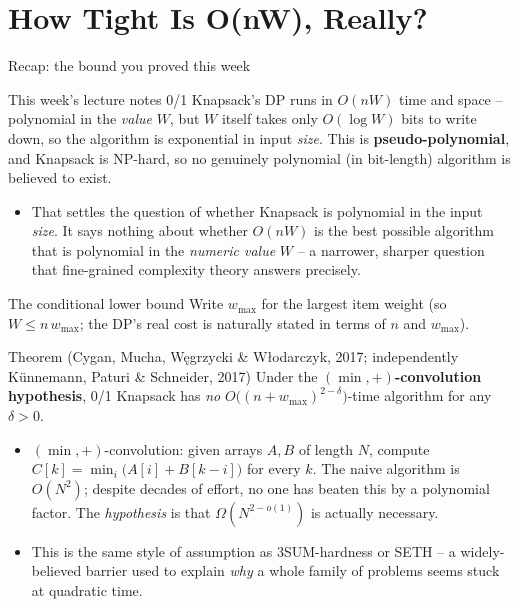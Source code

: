 \documentclass[11pt,aspectratio=169]{beamer}
\begin{document}
\section{How Tight Is O(nW), Really?}

\begin{frame}{Recap: the bound you proved this week}
  \begin{block}{This week's lecture notes}
    0/1 Knapsack's DP runs in $O(nW)$ time and space -- polynomial in the \emph{value}
    $W$, but $W$ itself takes only $O(\log W)$ bits to write down, so the algorithm is
    exponential in input \emph{size}. This is \textbf{pseudo-polynomial}, and Knapsack is
    NP-hard, so no genuinely polynomial (in bit-length) algorithm is believed to exist.
  \end{block}
  \begin{itemize}
    \item That settles the question of whether Knapsack is polynomial in the input
    \emph{size}. It says nothing about whether $O(nW)$ is the best possible algorithm
    that is polynomial in the \emph{numeric value} $W$ -- a narrower, sharper question
    that fine-grained complexity theory answers precisely.
  \end{itemize}
\end{frame}

\begin{frame}{The conditional lower bound}
  \small
  Write $w_{\max}$ for the largest item weight (so $W \le n\,w_{\max}$; the DP's real
  cost is naturally stated in terms of $n$ and $w_{\max}$).
  \begin{block}{Theorem (Cygan, Mucha, Węgrzycki \& Włodarczyk, 2017; independently
  Künnemann, Paturi \& Schneider, 2017)}
    Under the \textbf{$(\min,+)$-convolution hypothesis}, 0/1 Knapsack has \emph{no}
    $O\big((n+w_{\max})^{2-\delta}\big)$-time algorithm for any $\delta > 0$.
  \end{block}
  \begin{itemize}
    \item $(\min,+)$-convolution: given arrays $A, B$ of length $N$, compute
    $C[k] = \min_i \big(A[i] + B[k-i]\big)$ for every $k$. The naive algorithm is
    $O(N^2)$; despite decades of effort, no one has beaten this by a polynomial factor.
    The \emph{hypothesis} is that $\Omega(N^{2-o(1)})$ is actually necessary.
    \item This is the same style of assumption as 3SUM-hardness or SETH -- a
    widely-believed barrier used to explain \emph{why} a whole family of problems seems
    stuck at quadratic time.
  \end{itemize}
\end{frame}
\end{document}
